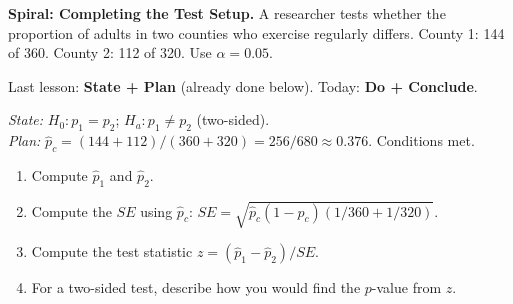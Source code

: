 \documentclass[10pt]{article}
\begin{document}
\namedateperiod

\vspace{0.15in}

\textbf{Spiral: Completing the Test Setup.}
A researcher tests whether the proportion of adults in two counties who exercise regularly
differs. County 1: 144 of 360. County 2: 112 of 320. Use $\alpha = 0.05$.

Last lesson: \textbf{State + Plan} (already done below). Today: \textbf{Do + Conclude}.

\textit{State:} $H_0: p_1=p_2$; $H_a: p_1 \ne p_2$ (two-sided).\\
\textit{Plan:} $\hat p_c = (144+112)/(360+320) = 256/680 \approx 0.376$. Conditions met.

\begin{enumerate}
  \item Compute $\hat p_1$ and $\hat p_2$. \writeline

  \item Compute the $SE$ using $\hat p_c$:
        $SE = \sqrt{\hat p_c(1-\hat p_c)(1/360 + 1/320)}$. 

  \item Compute the test statistic $z = (\hat p_1 - \hat p_2)/SE$. \writeline

  \item For a two-sided test, describe how you would find the $p$-value from $z$.
        \writeline
\end{enumerate}
\end{document}
